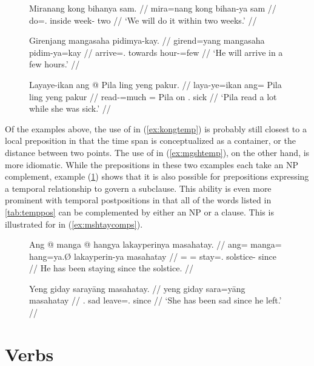\begin{figure}
\pex
\a\label{ex:kongtemp}\begingl
	\gla Miranang kong bihanya sam. //
	\glb mira=nang kong bihan-ya sam //
	\glc do=\Fpl{}.\Aarg{} inside week-\Loc{} two //
	\glft `We will do it within two weeks.' //
\endgl

\a\label{ex:mgshtemp}\begingl
	\gla Girenjang mangasaha pidimya-kay. //
	\glb girend=yang mangasaha pidim-ya=kay //
	\glc arrive=\TsgM{}.\Aarg{} towards hour-\Loc{}=few //
	\glft `He will arrive in a few hours.' //
\endgl

\a\label{ex:lingtemp}\begingl
	\gla Layaye-ikan ang @ Pila ling yeng pakur. //
	\glb laya-ye=ikan ang= Pila ling yeng pakur //
	\glc read-\TsgF{}=much \Aarg{}= Pila on \TsgF{}.\Aarg{} sick //
	\glft `Pila read a lot while she was sick.' //
\endgl
\xe
\end{figure}

Of the examples above, the use of  in (\ref{ex:kongtemp}) is
probably still closest to a local preposition in that the time span is
conceptualized as a container, or the distance between two points. The use of
 in (\ref{ex:mgshtemp}), on the other hand, is more
idiomatic. While the prepositions in these two examples each take an NP
complement, example (\ref{ex:lingtemp}) shows that it is also possible for
prepositions expressing a temporal relationship to govern a subclause. This
ability is even more prominent with temporal postpositions in that all of the
words listed in \autoref{tab:temppos} can be complemented by either an NP or a
clause. This is illustrated for  in
(\ref{ex:mshtaycomps}).

\begin{figure}[h]
\pex\label{ex:mshtaycomps}
\a\label{ex:mshtaynp}\begingl
	\gla Ang @ manga @ hangya lakayperinya masahatay. //
	\glb ang= manga= hang=ya.Ø lakayperin-ya masahatay //
	\glc \AgtT{}= \Prog{}= stay=\TsgM{}.\Top{} solstice-\Loc{} since //
	\glft He has been staying since the solstice. //
\endgl

\a\label{ex:mshtays}\begingl
	\gla Yeng giday sarayāng masahatay. //
	\glb yeng giday sara=yāng masahatay //
	\glc \TsgF{}.\Aarg{} sad leave=\TsgM{}.\Aarg{} since //
	\glft `She has been sad since he left.' //
\endgl
\xe
\end{figure}



\section{Verbs}
\label{sec:verbs}

